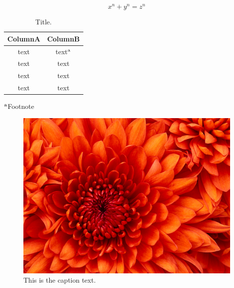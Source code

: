 \documentclass[12pt]{article}
\begin{document}
\begin{equation}
{x}^{n} + {y}^{n} = {z}^{n}
\end{equation}
\begin{table}[H]
	\centering
	\caption{Title.}
	\small
	\begin{tabular}{cc}
		\hline
		ColumnA & ColumnB \\ \hline
		text & text{\scriptsize $^{\rm a}$} \\
		text & text \\
		text & text \\
		text & text \\
		\hline
	\end{tabular}
	
	{\footnotesize 	{\scriptsize $^{\rm a}$}Footnote}
\end{table}
\begin{figure}[h] 
	\centering 	\includegraphics[width=0.5\linewidth]{Chrysanthemum.jpg}
	\caption{This is the caption text.}
	\label{fig:Chrysanthemum}
\end{figure}
\end{document}
